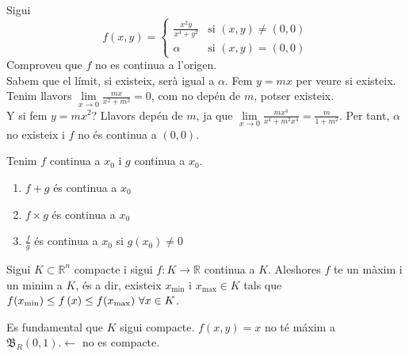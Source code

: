 \documentclass[../main.tex]{subfiles}
\begin{document}
    \begin{exercici}[14 de la llista 2]
        Sigui
        \begin{displaymath}
            f\left(x,y\right) = \begin{cases}
                \frac{x^2y}{x^4+y^2} & \text{si } \left(x,y\right) \neq \left(0,0\right)\\
                \alpha & \text{si } \left(x,y\right) = \left(0,0\right)
            \end{cases} 
        \end{displaymath}
        Comproveu que $f$ no es continua a l'origen.\\
        Sabem que el límit, si existeix, serà igual a $\alpha$. Fem $y = mx$ per veure si existeix.
        Tenim llavors $\lim\limits_{x\rightarrow 0} \frac{mx}{x^2+m^2} = 0$, com no depén de $m$,
        potser existeix.\\
        Y si fem $y=mx^2$? Llavors depén de $m$, ja que $\lim\limits_{x\rightarrow 0} \frac{mx^4}{x^4+m^2x^4} = \frac{m}{1+m^2}$.
        Per tant, $\alpha$ no existeix i $f$ no és continua a $\left(0,0\right)$. 
    \end{exercici}
    \begin{corolari}
        Tenim $f$ continua a $x_0$ i $g$ continua a $x_0$.
        \begin{enumerate}
            \item $f+g$ és continua a $x_0$
            \item $f\times g$ és continua a $x_0$
            \item $\frac{f}{g}$ és continua a $x_0$ si $g\left( x_0 \right) \neq 0$
        \end{enumerate}
    \end{corolari}
    \begin{teorema}
        Sigui $K \subset \mathbb{R}^n$ compacte i sigui $f: K \rightarrow \mathbb{R}$ continua a $K$.
        Aleshores $f$ te un màxim i un minim a $K$, és a dir, existeix $x_\text{min}$ i $x_\text{max} \in K$
        tals que $f(x_\text{min}) \leq f\left( x \right) \leq f(x_\text{max}) \hbox{ } \forall x \in K$.
    \end{teorema}
    \begin{obs}
        Es fundamental que $K$ sigui compacte. $f\left( x,y \right) = x$ no té máxim a $\mathfrak{B}_R\left( 0,1 \right). \leftarrow$ no
        es compacte.
    \end{obs}
\end{document}
